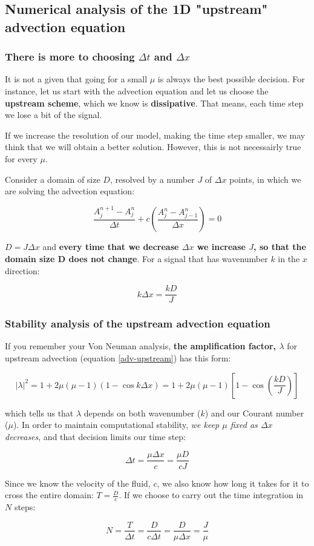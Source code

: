 \documentclass[xcolor=dvipsnames]{beamer} %
\newcommand{\BSS}{ \begin{scriptsize}}
\newcommand{\ESS}{ \end{scriptsize}}
\begin{document}
\subsection{Numerical analysis of the 1D "upstream" advection equation}
\frame
{
	\frametitle{There is more to choosing $\Delta t$ and $\Delta x $}
	\BSS
	It is not a given that going for a small $\mu$ is always the best possible decision.
	For instance, let us start with the advection equation and let us choose the \textbf{upstream scheme}, which we know is \textbf{dissipative}. That means, each time step we lose a bit of the signal.
	
	
	If we increase the resolution of our model, making the time step smaller, we may think that we will obtain a better solution. However, this is not necessairly true for every $\mu$.
	
	\medskip
	Consider a domain of size $D$, resolved by a number $J$ of $\Delta x$ points, in which we are solving the advection equation:
	
	\begin{equation}
		\frac {A_j^{n+1}-A_j^{n}}{\Delta t} +c \left(  \frac {A_j^{n}-A_{j-1}^{n}}{\Delta x}  \right) = 0
		\label{adv-upstream}
	\end{equation}
	
	$D=J \Delta x$ and {\bf every time that we decrease $\Delta x$ we increase $J$, so that the domain size D does not change}. For a signal that has wavenumber $k$ in the $x$ direction:
	
	\begin{equation}
		k \Delta x = \frac {k D}{J}
	\end{equation}
	
	\ESS
}

\frame
{
	\frametitle{Stability analysis of the upstream advection equation}
	
	\BSS
	If you remember your Von Neuman analysis, \textbf{the amplification factor, $\lambda$} for upstream advection (equation \ref{adv-upstream})	has this form:
	
	\begin{equation}
		|\lambda|^2 = 1+2\mu(\mu-1)(1-\cos k \Delta x) = 1+2\mu(\mu-1)[1-\cos ( \frac {k D} {J})]
	\end{equation}
	
	which tells us that $\lambda$ depends on both wavenumber ($k$) and our Courant number ($\mu$). 
	In order to maintain computational stability, \emph{we keep $\mu$ fixed as $\Delta x$ decreases}, and that decision limits our time step:
	
	\begin{equation}
		\Delta t = \frac {\mu \Delta x}{c} = \frac {\mu D}{cJ}
	\end{equation}
	
	Since we know the velocity of the fluid, $c$, we also know how long it takes for it to cross the entire domain: $T=\frac {D}{c}$. If we choose to carry out the time integration in $N$ steps:
	
	\begin{equation}
		N= \frac {T}{\Delta t} = \frac {D}{c \Delta t} = \frac {D}{\mu \Delta x} = \frac {J}{\mu}
	\end{equation}
	
	\ESS
}	
\end{document}
